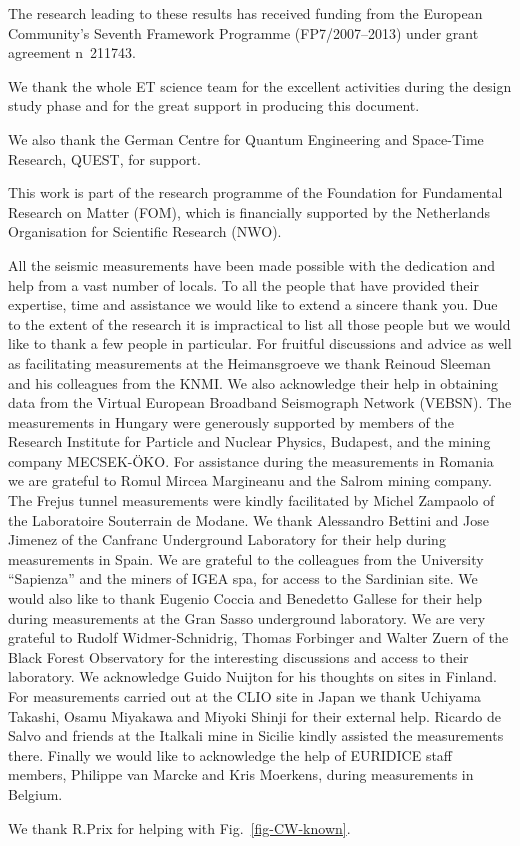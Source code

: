 The research leading to these results has received funding from the European
Community's Seventh Framework
Programme (FP7/2007--2013) under grant agreement n~211743. \par 
We thank the whole ET science team for the excellent activities 
during the design study phase and for the great support in producing this document.\par
We also thank the German Centre for Quantum Engineering and Space-Time Research, QUEST, for support.\par
This work is part of the research programme of the Foundation for Fundamental Research
 on Matter (FOM), which is financially supported by the Netherlands Organisation for
  Scientific Research (NWO).\par
  All the seismic measurements have been made possible with the dedication and help from a vast number of locals. To all the people that have provided their expertise, time and assistance we would like to extend a sincere thank you. Due to the extent of the research it is impractical to list all those people but we would like to thank a few people in particular. For fruitful discussions and advice as well as facilitating measurements at the Heimansgroeve we thank Reinoud Sleeman and his colleagues from the KNMI. We also acknowledge their help in obtaining data from the Virtual European Broadband Seismograph Network (VEBSN). The measurements in Hungary were generously supported by members of the Research Institute for Particle and Nuclear Physics, Budapest, and the mining company MECSEK-\"OKO. For assistance during the measurements in Romania we are grateful to Romul Mircea Margineanu and the Salrom mining company. The Frejus tunnel measurements were kindly facilitated by Michel Zampaolo of the Laboratoire Souterrain de Modane. We thank Alessandro Bettini and Jose Jimenez of the Canfranc Underground Laboratory for their help during measurements in Spain. We are grateful to the colleagues from the University ``Sapienza'' and the miners of IGEA spa, for access to the Sardinian site. We would also like to thank Eugenio Coccia and Benedetto Gallese for their help during measurements at the Gran Sasso underground laboratory. We are very grateful to Rudolf Widmer-Schnidrig, Thomas Forbinger and Walter Zuern of the Black Forest Observatory for the interesting discussions and access to their laboratory. We acknowledge Guido Nuijton for his thoughts on sites in Finland. For measurements carried out at the CLIO site in Japan we thank Uchiyama Takashi, Osamu Miyakawa and Miyoki Shinji for their external help. Ricardo de Salvo and friends at the Italkali mine in Sicilie kindly assisted the measurements there. Finally we would like to acknowledge the help of EURIDICE staff members, Philippe van Marcke and Kris Moerkens, during measurements in Belgium.\par
We thank R.Prix for helping with Fig.~\ref{fig-CW-known}.